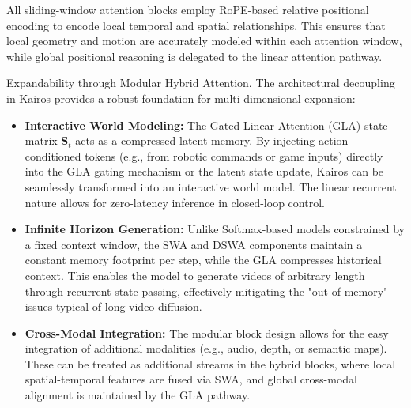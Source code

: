 All sliding-window attention blocks employ RoPE-based relative positional encoding to encode local temporal and spatial relationships. This ensures that local geometry and motion are accurately modeled within each attention window, while global positional reasoning is delegated to the linear attention pathway.


Expandability through Modular Hybrid Attention. The architectural decoupling in Kairos provides a robust foundation for multi-dimensional expansion:

\begin{itemize}

\item \textbf{Interactive World Modeling:} The Gated Linear Attention (GLA) state matrix $\mathbf{S}_t$ acts as a compressed latent memory. By injecting action-conditioned tokens (e.g., from robotic commands or game inputs) directly into the GLA gating mechanism or the latent state update, Kairos can be seamlessly transformed into an interactive world model. The linear recurrent nature allows for zero-latency inference in closed-loop control.

\item \textbf{Infinite Horizon Generation:} Unlike Softmax-based models constrained by a fixed context window, the SWA and DSWA components maintain a constant memory footprint per step, while the GLA compresses historical context. This enables the model to generate videos of arbitrary length through recurrent state passing, effectively mitigating the "out-of-memory" issues typical of long-video diffusion.

\item \textbf{Cross-Modal Integration:} The modular block design allows for the easy integration of additional modalities (e.g., audio, depth, or semantic maps). These can be treated as additional streams in the hybrid blocks, where local spatial-temporal features are fused via SWA, and global cross-modal alignment is maintained by the GLA pathway.

\end{itemize}







